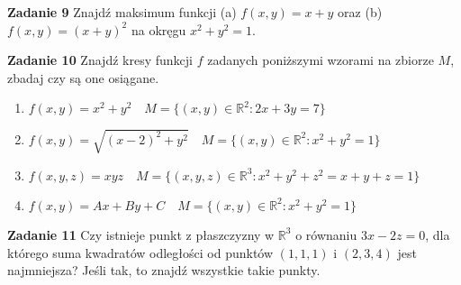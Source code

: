 \documentclass[a4paper,11pt]{article}
\begin{document}
\bigskip

\textbf{Zadanie 9} Znajdź maksimum funkcji (a) $f(x,y) = x+y$ oraz (b)
$f(x,y) =(x+y)^2$ na okręgu $x^2+y^2 = 1$.

\bigskip

\textbf{Zadanie 10} Znajdź kresy funkcji $f$ zadanych poniższymi wzorami
na zbiorze $M$, zbadaj czy są one osiągane.

\begin{enumerate}
  \item $f(x,y) = x^2 + y^2 \quad M=\{(x,y) \in \mathbb{R}^2 : 2x + 3y = 7\}$ 
  \item $f(x,y) = \sqrt{(x-2)^2 + y^2} \quad M=\{(x,y) \in \mathbb{R}^2 :
    x^2 + y^2= 1\}$ 
  \item $f(x,y,z) = xyz \quad M=\{(x,y,z) \in \mathbb{R}^3 : x^2 + y^2 +
      z^2= x+y+z = 1\}$ 
  \item $f(x,y) = Ax + By + C \quad M=\{(x,y) \in \mathbb{R}^2 : x^2 +
    y^2 = 1\}$ 
\end{enumerate}

\bigskip

\textbf{Zadanie 11} Czy istnieje punkt z płaszczyzny w $\mathbb{R}^3$ o
równaniu $3x − 2z = 0$, dla którego suma kwadratów odległości od punktów
$(1, 1, 1)$ i $(2, 3, 4)$ jest najmniejsza?  Jeśli tak, to znajdź
wszystkie takie punkty.
\end{document}
